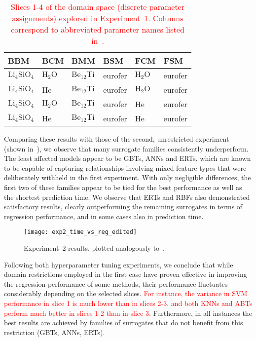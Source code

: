 \begin{table}[h]
	\centering
	\setlength\tabcolsep{5pt}
	\renewcommand{\arraystretch}{0.95}
	{\footnotesize
		\begin{tabular}{llllll}
		\toprule
		BBM & BCM & BMM & BSM & FCM & FSM \\
		\midrule
		$\text{Li}_4\text{SiO}_4$ & $\text{H}_2\text{O}$ & $\text{Be}_{12}\text{Ti}$ & eurofer & $\text{H}_2\text{O}$ & eurofer\\
		$\text{Li}_4\text{SiO}_4$ & He & $\text{Be}_{12}\text{Ti}$ & eurofer & $\text{H}_2\text{O}$ & eurofer\\
		$\text{Li}_4\text{SiO}_4$ & $\text{H}_2\text{O}$ & $\text{Be}_{12}\text{Ti}$ & eurofer & He & eurofer\\
		$\text{Li}_4\text{SiO}_4$ & He & $\text{Be}_{12}\text{Ti}$ & eurofer & He & eurofer\\
		\bottomrule
		\end{tabular}
	}
	\caption{\textcolor{red}{Slices 1-4 of the domain space (discrete parameter
	assignments) explored in Experiment~1. Columns correspond to abbreviated
	parameter names listed in~.}}
	\label{tbl:slices}
\end{table}

Comparing these results with those of the second, unrestricted experiment (shown
in~), we observe that many surrogate families
consistently underperform. The least affected models appear to be GBTs, ANNs and
ERTs, which are known to be capable of capturing relationships involving mixed
feature types that were deliberately withheld in the first experiment. With only
negligible differences, the first two of these families appear to be tied for
the best performance as well as the shortest prediction time. We observe that
ERTs and RBFs also demonstrated satisfactory results, clearly outperforming the
remaining surrogates in terms of regression performance, and in some cases also
in prediction time.

\begin{figure}
	\centering

	\hspace*{-0.1\columnwidth}
	\texttt{[image: exp2\_time\_vs\_reg\_edited]}
	\caption{\label{fig:exp2-time-vs-reg}Experiment~2 results, plotted analogously
	to~.}
\end{figure}

Following both hyperparameter tuning experiments, we conclude that while domain
restrictions employed in the first case have proven effective in improving the
regression performance of some methods, their performance fluctuates considerably
depending on the selected slices. \textcolor{red}{For instance, the variance in SVM performance
in slice 1 is much lower than in slices 2-3, and both KNNs and ABTs perform much
better in slices 1-2 than in slice 3.} Furthermore, in all instances the best
results are achieved by families of surrogates that do not benefit from this
restriction (GBTs, ANNs, ERTs).


